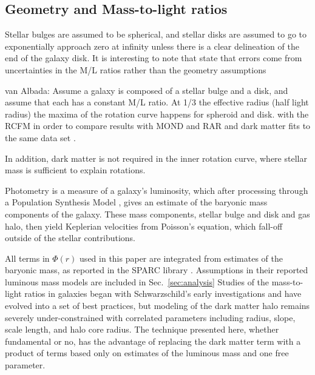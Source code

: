 \documentclass[reprint,%
 amsmath,amssymb,
 aps,
]{revtex4-1}
\begin{document}
 
\subsection{Geometry and Mass-to-light ratios}
 
  Stellar bulges are assumed to be spherical, and stellar disks are assumed to go to exponentially approach zero at  infinity unless there is a clear delineation of the end of the galaxy disk. It is interesting to note that \citet{2016Lelli} state that errors come from uncertainties in the M/L ratios rather than the geometry assumptions
   
   
 
 van Albada: Assume a galaxy is composed of a stellar bulge and a disk, and assume that each has a constant M/L ratio. At 1/3 the effective radius (half light radius) the maxima of the rotation curve happens for spheroid and disk. 
   with  the RCFM in order to compare results with    MOND and RAR and dark matter fits to the same data set   \cite{McGaugh_2014,Li_2018}. 

  In addition, dark matter is not required in the inner rotation curve, where stellar mass is sufficient to explain rotations. 
 
 
   
Photometry 
 is a measure of   a  galaxy's luminosity, which   after processing   through a Population Synthesis Model \cite{BelldYong,10.1093/mnras/sty3223}, gives an estimate of the  baryonic mass components of the galaxy. These mass components, stellar bulge and disk and gas halo, then     yield   Keplerian velocities 
   from Poisson's equation, which fall-off outside of the stellar contributions. 
   
   
 All terms in $\Phi(r)$ used in this paper  are    integrated from estimates of the baryonic mass, as reported in the      SPARC  library \cite{2016Lelli}.  
   Assumptions in their reported luminous mass models  are included in Sec.~\ref{sec:analysis}
Studies of the mass-to-light ratios in galaxies began with Schwarzschild's early investigations \cite{1954AJ.....59..273S} and have evolved into a set of best practices, but modeling of the 
dark matter halo remains severely   under-constrained with correlated parameters including radius, slope, scale length, and halo core radius.     
The technique presented here, whether fundamental or no,  has the advantage of replacing the dark matter term  with a product of terms based only on estimates of the luminous mass and   one free parameter.
\end{document}
